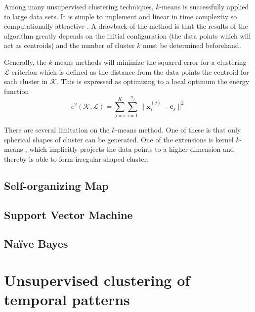Among many unsupervised clustering techniques, $k$-means is successfully 
applied to large data sets. It is simple to implement and linear in time 
complexity so computationally attractive \cite{jain1999data}. A drawback of 
the method is that the results of the algorithm greatly depends on the initial 
configuration (the data points which will act as centroids) and the number of 
cluster $k$ must be determined beforehand.

Generally, the $k$-means methods will minimize the squared error for a 
clustering $\mathcal{L}$ criterion which is defined as the distance from the 
data points the centroid for each cluster in $\mathcal{K}$. This is expressed 
as optimizing to a local optimum the energy function
\begin{equation} \label{eq:k-means energy}
e^2(\mathcal{K},\mathcal{L}) = 
\sum_{j=i}^{K}\sum_{i=1}^{n_j}\|\mathbf{x}_i^{(j)} - 
\mathbf{c}_j\|^2
\end{equation}

There are several limitation on the $k$-means method. One of these is that 
only spherical shapes of cluster can be generated. One of the extensions is 
kernel $k$-means \cite{scholkopf1998nonlinear}, which implicitly projects the 
data points to a higher dimension and thereby is able to form irregular shaped 
cluster.

\subsection{Self-organizing Map}

\subsection{Support Vector Machine}

\subsection{Na\"{i}ve Bayes}

\section{Unsupervised clustering of temporal patterns}
